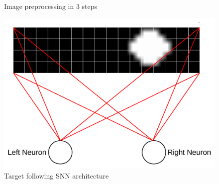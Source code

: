 \begin{frame}
\begin{columns}
\begin{overprint}
\begin{figure}
					\caption{Image preprocessing in 3 steps}
					\label{fig:img_pre}
				\end{figure}
				\begin{figure}
					\centering
					\includegraphics[width=\textwidth]{img/arch_tf.pdf}
					\caption{Target following SNN architecture}
					\label{fig:arch_tf}
				\end{figure}
			\end{overprint}
	\end{columns}
\end{frame}

